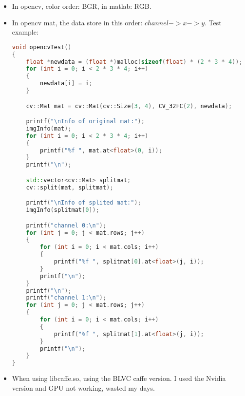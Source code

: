 \documentclass[12pt]{article}
\numberwithin{equation}{section}
\begin{document}
\begin{itemize}
\begin{lstlisting}[language=C++]
	sum = std::accumulate(v.begin(), v.end(), 0.0f);
	debug("True result:%f", sum);
}
		\end{lstlisting}
	For the False result, it gave answer 0, while the True result is 0.3.
	\item In opencv, color order: BGR, in matlab: RGB.
	\item In opencv mat, the data store in this order: $channel -> x -> y$. Test example:
		\begin{lstlisting}[language=C++]
void opencvTest()
{
	float *newdata = (float *)malloc(sizeof(float) * (2 * 3 * 4));
	for (int i = 0; i < 2 * 3 * 4; i++)
	{
		newdata[i] = i;
	}

	cv::Mat mat = cv::Mat(cv::Size(3, 4), CV_32FC(2), newdata);

	printf("\nInfo of original mat:");
	imgInfo(mat);
	for (int i = 0; i < 2 * 3 * 4; i++)
	{
		printf("%f ", mat.at<float>(0, i));
	}
	printf("\n");

	std::vector<cv::Mat> splitmat;
	cv::split(mat, splitmat);

	printf("\nInfo of splited mat:");
	imgInfo(splitmat[0]);

	printf("channel 0:\n");
	for (int j = 0; j < mat.rows; j++)
	{
		for (int i = 0; i < mat.cols; i++)
		{
			printf("%f ", splitmat[0].at<float>(j, i));
		}
		printf("\n");
	}
	printf("\n");
	printf("channel 1:\n");
	for (int j = 0; j < mat.rows; j++)
	{
		for (int i = 0; i < mat.cols; i++)
		{
			printf("%f ", splitmat[1].at<float>(j, i));
		}
		printf("\n");
	}
}
		\end{lstlisting}
	\item When using libcaffe.so, using the BLVC caffe version. I used the Nvidia version and GPU 
	not working, wasted my days.
\end{itemize}
\renewcommand\refname{Reference}

 
\clearpage
\end{document}
